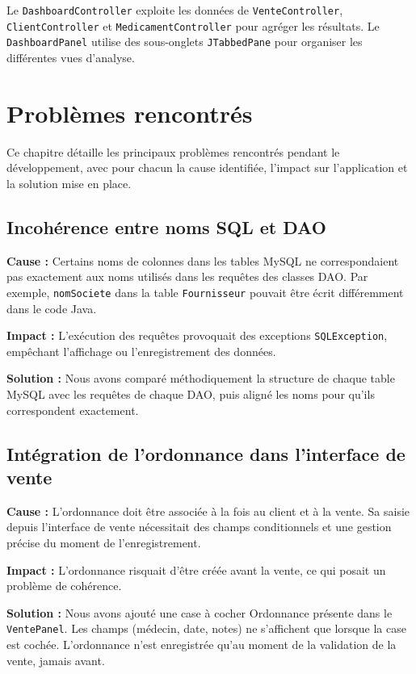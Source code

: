 \documentclass[12pt,a4paper]{report}
\begin{document}
Le \texttt{DashboardController} exploite les données de \texttt{VenteController}, \texttt{ClientController} et \texttt{MedicamentController} pour agréger les résultats. Le \texttt{DashboardPanel} utilise des sous-onglets \texttt{JTabbedPane} pour organiser les différentes vues d'analyse.

\chapter{Problèmes rencontrés}

Ce chapitre détaille les principaux problèmes rencontrés pendant le développement, avec pour chacun la cause identifiée, l'impact sur l'application et la solution mise en place.

\section{Incohérence entre noms SQL et DAO}

\textbf{Cause :} Certains noms de colonnes dans les tables MySQL ne correspondaient pas exactement aux noms utilisés dans les requêtes des classes DAO. Par exemple, \texttt{nomSociete} dans la table \texttt{Fournisseur} pouvait être écrit différemment dans le code Java.

\textbf{Impact :} L'exécution des requêtes provoquait des exceptions \texttt{SQLException}, empêchant l'affichage ou l'enregistrement des données.

\textbf{Solution :} Nous avons comparé méthodiquement la structure de chaque table MySQL avec les requêtes de chaque DAO, puis aligné les noms pour qu'ils correspondent exactement.

\section{Intégration de l'ordonnance dans l'interface de vente}

\textbf{Cause :} L'ordonnance doit être associée à la fois au client et à la vente. Sa saisie depuis l'interface de vente nécessitait des champs conditionnels et une gestion précise du moment de l'enregistrement.

\textbf{Impact :} L'ordonnance risquait d'être créée avant la vente, ce qui posait un problème de cohérence.

\textbf{Solution :} Nous avons ajouté une case à cocher \og Ordonnance présente \fg{} dans le \texttt{VentePanel}. Les champs (médecin, date, notes) ne s'affichent que lorsque la case est cochée. L'ordonnance n'est enregistrée qu'au moment de la validation de la vente, jamais avant.
\end{document}
